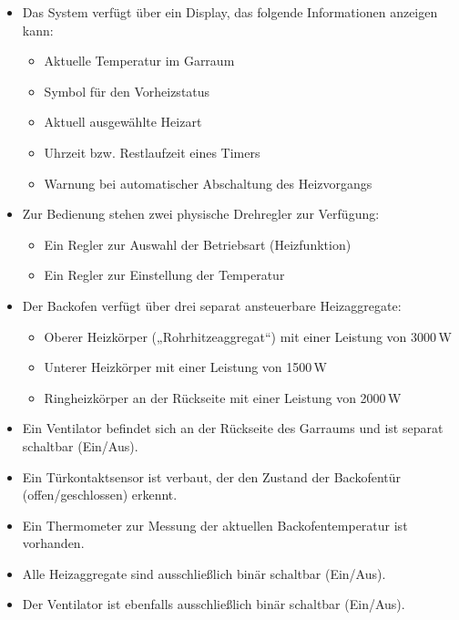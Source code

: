 \documentclass[a4paper,12pt]{article}
\begin{document}
\begin{itemize}
    \item Das System verfügt über ein Display, das folgende Informationen anzeigen kann:
    \begin{itemize}
        \item Aktuelle Temperatur im Garraum
        \item Symbol für den Vorheizstatus
        \item Aktuell ausgewählte Heizart
        \item Uhrzeit bzw. Restlaufzeit eines Timers
        \item Warnung bei automatischer Abschaltung des Heizvorgangs
    \end{itemize}

    \item Zur Bedienung stehen zwei physische Drehregler zur Verfügung:
    \begin{itemize}
        \item Ein Regler zur Auswahl der Betriebsart (Heizfunktion)
        \item Ein Regler zur Einstellung der Temperatur
    \end{itemize}

    \item Der Backofen verfügt über drei separat ansteuerbare Heizaggregate:
    \begin{itemize}
        \item Oberer Heizkörper („Rohrhitzeaggregat“) mit einer Leistung von 3000\,W
        \item Unterer Heizkörper mit einer Leistung von 1500\,W
        \item Ringheizkörper an der Rückseite mit einer Leistung von 2000\,W
    \end{itemize}

    \item Ein Ventilator befindet sich an der Rückseite des Garraums und ist separat schaltbar (Ein/Aus).

    \item Ein Türkontaktsensor ist verbaut, der den Zustand der Backofentür (offen/geschlossen) erkennt.

    \item Ein Thermometer zur Messung der aktuellen Backofentemperatur ist vorhanden.

    \item Alle Heizaggregate sind ausschließlich binär schaltbar (Ein/Aus).

    \item Der Ventilator ist ebenfalls ausschließlich binär schaltbar (Ein/Aus).
\end{itemize}
\end{document}
